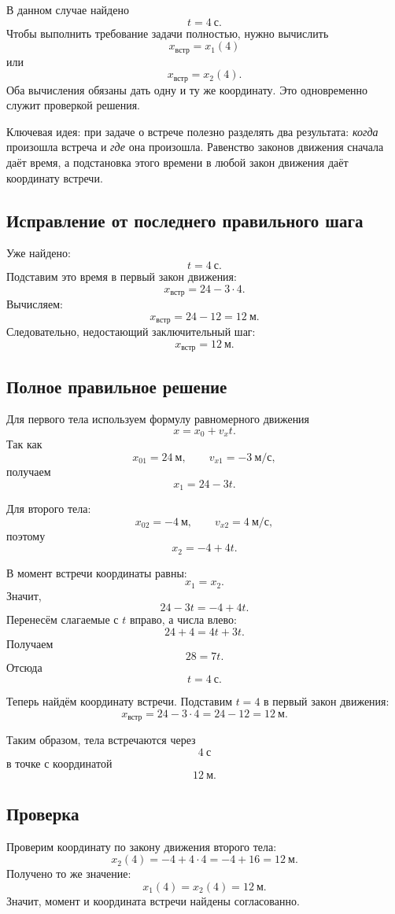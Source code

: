 \documentclass[12pt,a4paper]{article}
\begin{document}
В данном случае найдено
\[
t=4\ \text{с}.
\]
Чтобы выполнить требование задачи полностью, нужно вычислить
\[
x_{\text{встр}}=x_1(4)
\]
или
\[
x_{\text{встр}}=x_2(4).
\]
Оба вычисления обязаны дать одну и ту же координату. Это одновременно служит проверкой решения.

\textcolor{blue!60!black}{Ключевая идея:} при задаче о встрече полезно разделять два результата: \emph{когда} произошла встреча и \emph{где} она произошла. Равенство законов движения сначала даёт время, а подстановка этого времени в любой закон движения даёт координату встречи.

\subsection*{Исправление от последнего правильного шага}
Уже найдено:
\[
t=4\ \text{с}.
\]
Подставим это время в первый закон движения:
\[
x_{\text{встр}}=24-3\cdot 4.
\]
Вычисляем:
\[
x_{\text{встр}}=24-12=12\ \text{м}.
\]
Следовательно, недостающий заключительный шаг:
\[
\boxed{x_{\text{встр}}=12\ \text{м}}.
\]

\subsection*{Полное правильное решение}
Для первого тела используем формулу равномерного движения
\[
x=x_0+v_xt.
\]
Так как
\[
x_{01}=24\ \text{м},\qquad v_{x1}=-3\ \text{м/с},
\]
получаем
\[
x_1=24-3t.
\]

Для второго тела:
\[
x_{02}=-4\ \text{м},\qquad v_{x2}=4\ \text{м/с},
\]
поэтому
\[
x_2=-4+4t.
\]

В момент встречи координаты равны:
\[
x_1=x_2.
\]
Значит,
\[
24-3t=-4+4t.
\]
Перенесём слагаемые с $t$ вправо, а числа влево:
\[
24+4=4t+3t.
\]
Получаем
\[
28=7t.
\]
Отсюда
\[
t=4\ \text{с}.
\]

Теперь найдём координату встречи. Подставим $t=4$ в первый закон движения:
\[
x_{\text{встр}}=24-3\cdot4=24-12=12\ \text{м}.
\]

Таким образом, тела встречаются через
\[
4\ \text{с}
\]
в точке с координатой
\[
12\ \text{м}.
\]

\subsection*{Проверка}
Проверим координату по закону движения второго тела:
\[
x_2(4)=-4+4\cdot4=-4+16=12\ \text{м}.
\]
Получено то же значение:
\[
x_1(4)=x_2(4)=12\ \text{м}.
\]
Значит, момент и координата встречи найдены согласованно.
\end{document}
